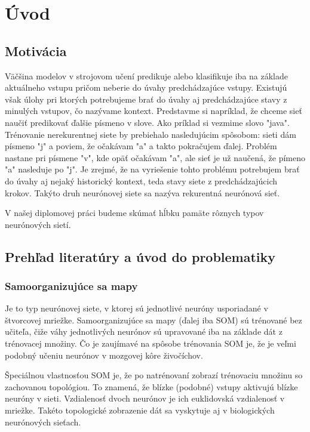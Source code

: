 \chapter{Úvod}

\section{Motivácia}
Väčšina modelov v strojovom učení predikuje alebo klasifikuje iba na základe aktuálneho vstupu pričom neberie do úvahy predchádzajúce vstupy. Existujú však úlohy pri ktorých potrebujeme brať do úvahy aj predchádzajúce stavy z minulých vstupov, čo nazývame kontext. 
Predstavme si napríklad, že chceme sieť naučiť predikovať ďalšie písmeno v slove. Ako príklad si vezmime slovo "java". Trénovanie nerekurentnej siete by prebiehalo nasledujúcim spôsobom: sieti dám písmeno "j" a poviem, že očakávam "a" a takto pokračujem ďalej. Problém nastane pri písmene "v", kde opäť očakávam "a", ale sieť je už naučená, že pímeno "a" nasleduje po "j". Je zrejmé, že na vyriešenie tohto problému potrebujem brať do úvahy aj nejaký historický kontext, teda stavy siete z predchádzajúcich krokov.
Takýto druh neurónovej siete sa nazýva rekurentná neurónová sieť.

V našej diplomovej práci budeme skúmať hĺbku pamäte rôznych typov neurónových sietí. 

\section{Prehľad literatúry a úvod do problematiky}
\subsection{Samoorganizujúce sa mapy}
Je to typ neurónovej siete, v ktorej sú jednotlivé neuróny usporiadané v štvorcovej mriežke. Samoorganizujúce sa mapy (ďalej iba SOM) sú trénované bez učiteľa, čiže váhy jednotlivých neurónov sú upravované iba na základe dát z trénovacej množiny. Čo je zaujímavé na spôsobe trénovania SOM je, že je veľmi podobný učeniu neurónov v mozgovej kôre živočíchov.

Špeciálnou vlastnosťou SOM je, že po natrénovaní zobrazí trénovaciu množinu so zachovanou topológiou. To znamená, že blízke (podobné) vstupy aktivujú blízke neuróny v sieti. Vzdialenosť dvoch neurónov je ich euklidovská vzdialenosť v mriežke. Takéto topologické zobrazenie dát sa vyskytuje aj v biologických neurónových sieťach.

